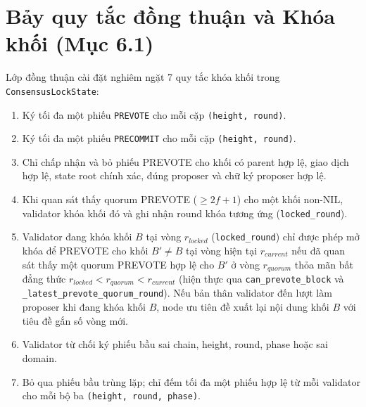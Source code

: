 \documentclass[10pt,a4paper]{report}
\begin{document}
\section{Bảy quy tắc đồng thuận và Khóa khối (Mục 6.1)}
Lớp đồng thuận cài đặt nghiêm ngặt 7 quy tắc khóa khối trong \texttt{ConsensusLockState}:
\begin{enumerate}
  \item Ký tối đa một phiếu \texttt{PREVOTE} cho mỗi cặp \texttt{(height, round)}.
  \item Ký tối đa một phiếu \texttt{PRECOMMIT} cho mỗi cặp \texttt{(height, round)}.
  \item Chỉ chấp nhận và bỏ phiếu PREVOTE cho khối có parent hợp lệ, giao dịch hợp lệ, state root chính xác, đúng proposer và chữ ký proposer hợp lệ.
  \item Khi quan sát thấy quorum PREVOTE ($\ge 2f + 1$) cho một khối non-NIL, validator khóa khối đó và ghi nhận round khóa tương ứng (\texttt{locked\_round}).
  \item Validator đang khóa khối $B$ tại vòng $r_{locked}$ (\texttt{locked\_round}) chỉ được phép mở khóa để PREVOTE cho khối $B' \neq B$ tại vòng hiện tại $r_{current}$ nếu đã quan sát thấy một quorum PREVOTE hợp lệ cho $B'$ ở vòng $r_{quorum}$ thỏa mãn bất đẳng thức $r_{locked} < r_{quorum} < r_{current}$ (hiện thực qua \texttt{can\_prevote\_block} và \texttt{\_latest\_prevote\_quorum\_round}). Nếu bản thân validator đến lượt làm proposer khi đang khóa khối $B$, node ưu tiên đề xuất lại nội dung khối $B$ với tiêu đề gắn số vòng mới.
  \item Validator từ chối ký phiếu bầu sai chain, height, round, phase hoặc sai domain.
  \item Bỏ qua phiếu bầu trùng lặp; chỉ đếm tối đa một phiếu hợp lệ từ mỗi validator cho mỗi bộ ba \texttt{(height, round, phase)}.
\end{enumerate}
\end{document}
